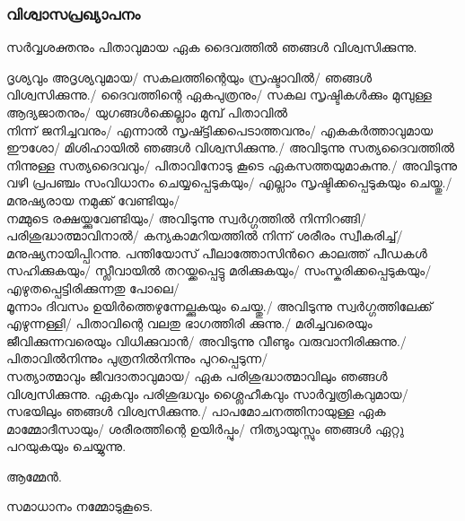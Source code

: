 \documentclass[20pt]{beamer}
\newcommand{\Priest}[1]{\color{white}#1}
\newcommand{\People}[1]{\color{yellow}#1}
\newcommand{\Server}[1]{\color{lightgray}#1}
\newcommand{\Ammen}{\People{ആമ്മേന്‍.}}
\newcommand{\Peace}{\Server{സമാധാനം നമ്മോടുകൂടെ.}}
\begin{document}
\begin{frame}[allowframebreaks]
\frametitle{വിശ്വാസപ്രഖ്യാപനം}
\Priest{
സര്‍വ്വശക്തനും പിതാവുമായ ഏക ദൈവത്തില്‍ ഞങ്ങള്‍ വിശ്വസിക്കുന്നു.}\par
\People{
ദൃശ്യവും അദൃശ്യവുമായ/ സകലത്തിന്റെയും സ്രഷ്ടാവില്‍/
ഞങ്ങള്‍ വിശ്വസിക്കുന്നു./ ദൈവത്തിന്റെ ഏകപുത്രനും/
സകല സൃഷ്ടികള്‍ക്കും മുമ്പുള്ള ആദ്യജാതനും/
യുഗങ്ങള്‍ക്കെല്ലാം മുമ്പ് പിതാവില്‍ \\ \framebreak 
നിന്ന് ജനിച്ചവനും/ എന്നാല്‍ സൃഷ്ട്ടിക്കപെടാത്തവനും/
എകകര്‍ത്താവുമായ ഈശോ/ മിശിഹായില്‍ ഞങ്ങള്‍ വിശ്വസിക്കുന്നു./
അവിടുന്നു സത്യദൈവത്തില്‍ നിന്നുള്ള സത്യദൈവവും/
പിതാവിനോടു കൂടെ ഏകസത്തയുമാകുന്നു./
അവിടുന്നു വഴി പ്രപഞ്ചം സംവിധാനം ചെയ്യപ്പെടുകയും/
എല്ലാം സൃഷ്ടിക്കപ്പെടുകയും ചെയ്തു./ മനുഷ്യരായ നമുക്ക് വേണ്ടിയും/
\\ \framebreak 
നമ്മുടെ രക്ഷയ്ക്കുവേണ്ടിയും/ അവിടുന്നു 
സ്വര്‍ഗ്ഗത്തില്‍ നിന്നിറങ്ങി/ പരിശുദ്ധാത്മാവിനാല്‍/
കന്യകാമറിയത്തില്‍ നിന്ന് ശരീരം സ്വീകരിച്ച്/മനുഷ്യനായിപ്പിറന്നു.
പന്തിയോസ് പീലാത്തോസിന്‍റെ കാലത്ത്
പീഡകള്‍ സഹിക്കുകയും/ സ്ലീവായില്‍ തറയ്ക്കപ്പെട്ടു 
മരിക്കുകയും/ സംസ്കരിക്കപ്പെടുകയും/
എഴുതപ്പെട്ടിരിക്കുന്നതു പോലെ/\\ \framebreak
മൂന്നാം ദിവസം ഉയിര്‍ത്തെഴുന്നേല്ക്കുകയും ചെയ്തു./
അവിടുന്നു സ്വര്‍ഗ്ഗത്തിലേക്ക് എഴുന്നള്ളി/
പിതാവിന്റെ വലതു ഭാഗത്തിരി ക്കുന്നു./
മരിച്ചവരെയും ജീവിക്കുന്നവരെയും വിധിക്കുവാന്‍/
അവിടുന്നു വീണ്ടും വരുവാനിരിക്കുന്നു./
പിതാവില്‍നിന്നും പുത്രനില്‍നിന്നും പുറപ്പെടുന്ന/\\ \framebreak
സത്യാത്മാവും ജീവദാതാവുമായ/
ഏക പരിശുദ്ധാത്മാവിലും ഞങ്ങള്‍ വിശ്വസിക്കുന്നു.
ഏകവും പരിശുദ്ധവും ശ്ലൈഹീകവും സാര്‍വ്വത്രികവുമായ/
സഭയിലും ഞങ്ങള്‍ വിശ്വസിക്കുന്നു./
പാപമോചനത്തിനായുള്ള ഏക മാമ്മോദീസായും/
ശരീരത്തിന്റെ ഉയിര്‍പ്പും/ നിത്യായുസ്സും ഞങ്ങള്‍ ഏറ്റു
പറയുകയും ചെയ്യുന്നു.\par \Ammen}
\end{frame}

\begin{frame}
\Peace
\end{frame}
\end{document}
